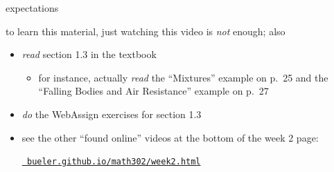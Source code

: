 \documentclass{beamer}
\begin{document}
\begin{frame}{expectations}

to learn this material, just watching this video is \emph{not} enough; also
\begin{itemize}
\item \emph{read} section 1.3 in the textbook
    \begin{itemize}
    \item for instance, actually \emph{read} the ``Mixtures'' example on p.~25 and the ``Falling Bodies and Air Resistance'' example on p.~27
    \end{itemize}
\item \emph{do} the WebAssign exercises for section 1.3
\item see the other ``found online'' videos at the bottom of the week 2 page:

\centerline{\href{https://bueler.github.io/math302/week2.html}{\tt \color{cyan} bueler.github.io/math302/week2.html}}
\end{itemize}
\end{frame}
\end{document}
